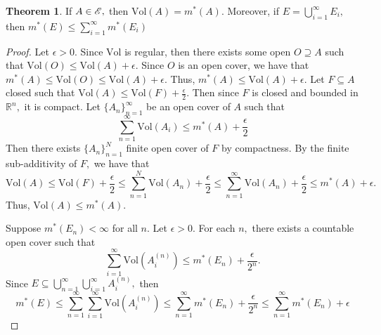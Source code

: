 \documentclass[10pt, oneside]{article}
\newcommand{\bbR}{\mathbb{R}}
\newcommand{\Vol}{\text{Vol}}
\theoremstyle{definition}
\newtheorem{thm}{Theorem}
\begin{document}
\begin{thm}
    If $A\in \cal E,$ then $\Vol(A) = m^*(A).$ Moreover, if $E = \bigcup_{i=1}^\infty E_i,$ then $m^*(E) \leq \sum_{i=1}^\infty m^*(E_i)$
\end{thm}

\begin{proof}
    Let $\epsilon>0.$ Since $\Vol$ is regular, then there exists some open $O \supseteq A$ such that $\Vol(O) \leq \Vol(A) + \epsilon.$ Since $O$ is an open cover, we have that $m^*(A) \leq \Vol(O) \leq \Vol(A) + \epsilon.$ Thus, $m^*(A) \leq \Vol(A) + \epsilon.$ Let $F \subseteq A$ closed such that $\Vol(A) \leq \Vol(F) + \frac{\epsilon}{2}.$ Then since $F$ is closed and bounded in $\bbR^n,$ it is compact. Let $\{A_n\}_{n=1}^\infty$ be an open cover of $A$ such that 
    \[\sum_{n=1}^\infty \Vol(A_i) \leq   m^*(A) + \frac{\epsilon}{2}\]
    Then there exists $\{A_n\}_{n=1}^N$ finite open cover of $F$ by compactness. By the finite sub-additivity of $F,$ we have that 
    \[\Vol(A) \leq \Vol(F) + \frac{\epsilon}{2} \leq \sum_{n=1}^N \Vol(A_n) + \frac{\epsilon}{2} \leq \sum_{n=1}^\infty \Vol(A_n) + \frac{\epsilon}{2} \leq m^*(A) + \epsilon.\] Thus, $\Vol(A) \leq m^*(A).$

    Suppose $m^*(E_n) < \infty$ for all $n.$ Let $\epsilon>0.$ For each $n,$ there exists a countable open cover such that 
    \[\sum_{i=1}^\infty \Vol(A_i^{(n)}) \leq m^*(E_n) + \frac{\epsilon}{2^n}.\] Since $E\subseteq \bigcup_{n=1}^\infty \bigcup_{i=1}^\infty A_i^{(n)},$ then 
    \[m^*(E) \leq \sum_{n=1}^\infty \sum_{i=1}^\infty \Vol(A_i^{(n)}) \leq \sum_{n=1}^\infty m^*(E_n) + \frac{\epsilon}{2^n} \leq \sum_{n=1}^\infty m^*(E_n)  + \epsilon\]
\end{proof}

\newpage
\end{document}
